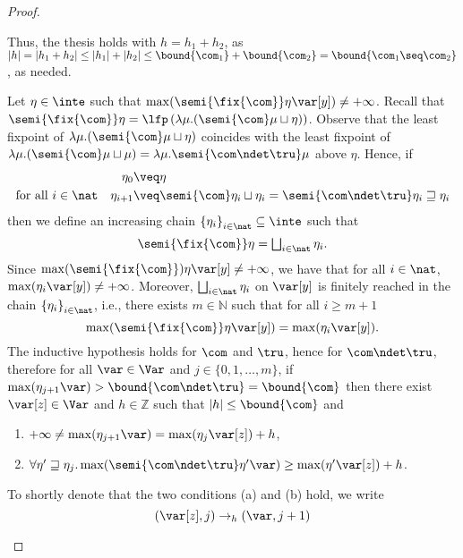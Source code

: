 \begin{proof}
\begin{inductive}
    Thus, the thesis holds with \(h= h_1+h_2\), as
    \(|h| =|h_1 +h_2| \leq |h_1| + |h_2| \leq \bound{\com_1} +
    \bound{\com_2} = \bound{\com_1 \seq \com_2}\), as needed.

    
    \case{\(\fix{\com}\)}
    Let \(\eta \in \inte\) such that
    \(\max(\semi{\fix{\com}} \eta \var[y]) \neq + \infty\). Recall
    that
    \(\semi{\fix{\com}} \eta = \lfp\left({\lambda \mu. (\semi{\com}
        \mu \sqcup\eta)}\right)\). Observe that the least fixpoint of
    \({\lambda \mu. (\semi{\com} \mu \sqcup\eta)}\) coincides with the
    least fixpoint of
    \({\lambda \mu. (\semi{\com} \mu \sqcup \mu)} = \lambda \mu. \semi{
      \com\ndet \tru} \mu\) above \(\eta\). Hence, if
    \begin{align*}
    \eta_0 & \veq \eta \\
    \text{for all } i\in \nat \quad \eta_{i+1} & \veq \semi{\com} \eta_i \sqcup \eta_i= \semi{\com \ndet \tru} \eta_i \sqsupseteq \eta_i
    \end{align*}
    then we define an increasing chain
    \({\{\eta_i\}}_{i\in \nat}\subseteq \inte\) such that
    \[ 
      \semi{\fix{\com}} \eta = \textstyle\bigsqcup_{i \in \nat} \eta_i.
    \]
    Since \(\max(\semi{\fix{\com}}) \eta \var[y] \neq +\infty\), we have
    that for all \(i\in \nat\), \(\max(\eta_i \var[y]) \neq
    +\infty\). Moreover, \(\textstyle\bigsqcup_{i \in \nat} \eta_i\) on
    \(\var[y]\) is finitely reached in the chain
    \({\{\eta_i\}}_{i\in \nat}\), i.e., there exists
    \(m \in \mathbb{N}\) such that for all \(i \geq m+1\)
    \[
      \max(\semi{\fix{\com}} \eta \var[y]) = \max(\eta_{i} \var[y]).
    \]
    The inductive hypothesis holds for \(\com\) and \(\tru\), hence for
    \(\com \ndet \tru\), therefore for all \(\var \in \Var\) and
    \(j \in \{0,1, \ldots, m\}\), if \(\max(\eta_{j+1} \var) >\bound{\com\ndet \tru} =\bound{\com}\) then
    there exist \(\var[z] \in \Var\) and \(h \in \mathbb{Z}\) such that \(|h| \leq \bound{\com}\) and 
    \begin{enumerate}[label=(\alph*)]
    \item\label{pointa} \(+\infty \neq \max(\eta_{j+1} \var) = \max(\eta_j \var[z]) + h\),
    \item\label{pointb} \(\forall \eta' \sqsupseteq \eta_j.
      \max(\semi{\com \ndet \tru}\eta'\var) \geq \max(\eta' \var[z]) + h\).
    \end{enumerate}
    To shortly denote that the two conditions (a) and (b) hold, we write
    \[
      (\var[z],j) \to_{h} (\var, j+1)
    \]
    

\end{inductive}
\end{proof}
